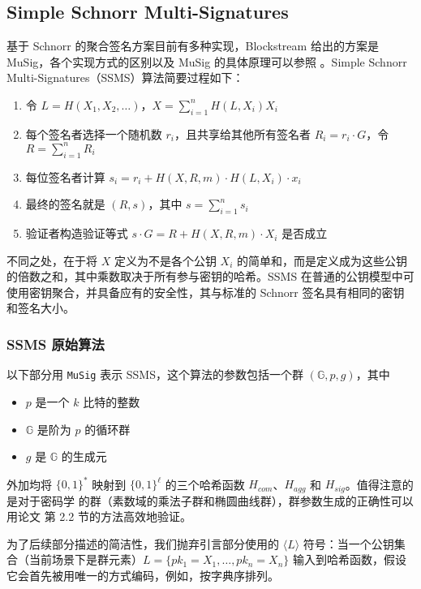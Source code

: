 \documentclass[a4paper,10pt]{article}
\begin{document}
\subsection{Simple Schnorr Multi-Signatures}

基于 Schnorr 的聚合签名方案目前有多种实现，Blockstream 给出的方案是 MuSig，各个实现方式的区别以及 MuSig 的具体原理可以参照 \cite{2019Simple,The-MuSig-Schnorr-Signature-Scheme}。Simple Schnorr Multi-Signatures（SSMS）算法简要过程如下：

\begin{enumerate}
  \item 令 \(L=H(X_1,X_2,\dots)\)，\(X=\sum_{i=1}^n H(L,X_i)X_i\)
  \item 每个签名者选择一个随机数 \(r_i\)，且共享给其他所有签名者 \(R_i=r_i\cdot G\)，令 \(R=\sum_{i=1}^n R_i\)
  \item 每位签名者计算 \(s_i=r_i+H(X,R,m)\cdot H(L,X_i)\cdot x_i\)
  \item 最终的签名就是 \((R,s)\)，其中 \(s=\sum_{i=1}^n s_i\)
  \item\label{ms-bn-verify} 验证者构造验证等式 \(s\cdot G=R+H(X,R,m)\cdot X_i\) 是否成立 
\end{enumerate}

不同之处，在于将 \(X\) 定义为不是各个公钥 \(X_i\) 的简单和，而是定义成为这些公钥的倍数之和，其中乘数取决于所有参与密钥的哈希。SSMS 在普通的公钥模型中可使用密钥聚合，并具备应有的安全性，其与标准的 Schnorr 签名具有相同的密钥和签名大小。

\subsubsection{SSMS 原始算法}
以下部分用 \texttt{MuSig} 表示 SSMS，这个算法的参数包括一个群 \((\mathbb{G},p,g)\)，其中
\begin{itemize}
  \item \(p\) 是一个 \(k\) 比特的整数
  \item \(\mathbb{G}\) 是阶为 \(p\) 的循环群
  \item \(g\) 是 \(\mathbb{G}\) 的生成元
\end{itemize}

外加均将 \(\{0,1\}^*\) 映射到 \(\{0,1\}^{\ell}\) 的三个哈希函数 \(H_{com}\)、\(H_{agg}\) 和 \(H_{sig}\)。值得注意的是对于密码学
的群（素数域的乘法子群和椭圆曲线群），群参数生成的正确性可以用论文 \cite{2019Simple} 第 2.2 节的方法高效地验证。

为了后续部分描述的简洁性，我们抛弃引言部分使用的 \(\langle L \rangle\) 符号：当一个公钥集合（当前场景下是群元素）\(L=\{pk_1=X_1,\dots,pk_n=X_n\}\) 输入到哈希函数，假设它会首先被用唯一的方式编码，例如，按字典序排列。
\end{document}
